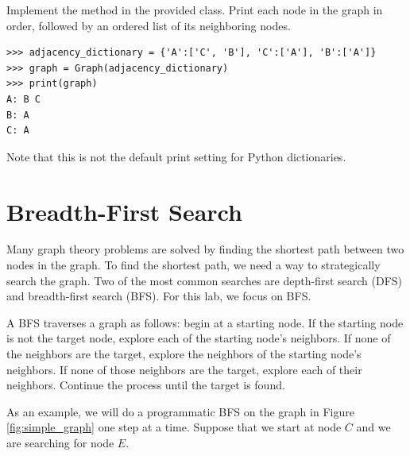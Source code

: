 \begin{problem}
Implement the  method in the provided  class.
Print each node in the graph in order, followed by an ordered list of its neighboring nodes.
\begin{lstlisting}
>>> adjacency_dictionary = {'A':['C', 'B'], 'C':['A'], 'B':['A']}
>>> graph = Graph(adjacency_dictionary)
>>> print(graph)
A: B C
B: A
C: A
\end{lstlisting}
Note that this is not the default print setting for Python dictionaries.
\end{problem}

\section*{Breadth-First Search}

Many graph theory problems are solved by finding the shortest path between two nodes in the graph.
To find the shortest path, we need a way to strategically search the graph.
Two of the most common searches are depth-first search (DFS) and breadth-first search (BFS).
For this lab, we focus on BFS.

A BFS traverses a graph as follows: begin at a starting node.
If the starting node is not the target node, explore each of the starting node's neighbors.
If none of the neighbors are the target, explore the neighbors of the starting node's neighbors.
If none of those neighbors are the target, explore each of their neighbors.
Continue the process until the target is found.

As an example, we will do a programmatic BFS on the graph in Figure \ref{fig:simple_graph} one step at a time.
Suppose that we start at node $C$ and we are searching for node $E$.

